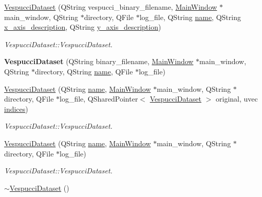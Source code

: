\begin{DoxyCompactItemize}
\item 
\hyperlink{class_vespucci_dataset_abdada511afcfc13a2f5ffc09138a1755}{Vespucci\+Dataset} (Q\+String vespucci\+\_\+binary\+\_\+filename, \hyperlink{class_main_window}{Main\+Window} $\ast$main\+\_\+window, Q\+String $\ast$directory, Q\+File $\ast$log\+\_\+file, Q\+String \hyperlink{class_vespucci_dataset_ae5b30cb466acfdf741b360bc4f897cc9}{name}, Q\+String \hyperlink{class_vespucci_dataset_acb6a4de101573ac93f5fcb5dd5e38c5c}{x\+\_\+axis\+\_\+description}, Q\+String \hyperlink{class_vespucci_dataset_ae49a51e6e1666cea514bec6bf5578405}{y\+\_\+axis\+\_\+description})
\begin{DoxyCompactList}\small\item\em Vespucci\+Dataset\+::\+Vespucci\+Dataset. \end{DoxyCompactList}\item 
\hypertarget{class_vespucci_dataset_a32bc7599581ddbcf425c03de33997cb5}{{\bfseries Vespucci\+Dataset} (Q\+String binary\+\_\+filename, \hyperlink{class_main_window}{Main\+Window} $\ast$main\+\_\+window, Q\+String $\ast$directory, Q\+String \hyperlink{class_vespucci_dataset_ae5b30cb466acfdf741b360bc4f897cc9}{name}, Q\+File $\ast$log\+\_\+file)}\label{class_vespucci_dataset_a32bc7599581ddbcf425c03de33997cb5}

\item 
\hyperlink{class_vespucci_dataset_a804af150636c59f3109a6a54267a861d}{Vespucci\+Dataset} (Q\+String \hyperlink{class_vespucci_dataset_ae5b30cb466acfdf741b360bc4f897cc9}{name}, \hyperlink{class_main_window}{Main\+Window} $\ast$main\+\_\+window, Q\+String $\ast$directory, Q\+File $\ast$log\+\_\+file, Q\+Shared\+Pointer$<$ \hyperlink{class_vespucci_dataset}{Vespucci\+Dataset} $>$ original, uvec \hyperlink{class_vespucci_dataset_a7472b4eb9f6ea7245ed544287ebe4a8b}{indices})
\begin{DoxyCompactList}\small\item\em Vespucci\+Dataset\+::\+Vespucci\+Dataset. \end{DoxyCompactList}\item 
\hyperlink{class_vespucci_dataset_a15f16bb144fb3948e5277706d0959009}{Vespucci\+Dataset} (Q\+String \hyperlink{class_vespucci_dataset_ae5b30cb466acfdf741b360bc4f897cc9}{name}, \hyperlink{class_main_window}{Main\+Window} $\ast$main\+\_\+window, Q\+String $\ast$directory, Q\+File $\ast$log\+\_\+file)
\begin{DoxyCompactList}\small\item\em Vespucci\+Dataset\+::\+Vespucci\+Dataset. \end{DoxyCompactList}\item 
\hypertarget{class_vespucci_dataset_aa9d0b0fd3cff79098cf16d44a94c6204}{\hyperlink{class_vespucci_dataset_aa9d0b0fd3cff79098cf16d44a94c6204}{$\sim$\+Vespucci\+Dataset} ()}\label{class_vespucci_dataset_aa9d0b0fd3cff79098cf16d44a94c6204}


\end{DoxyCompactItemize}
